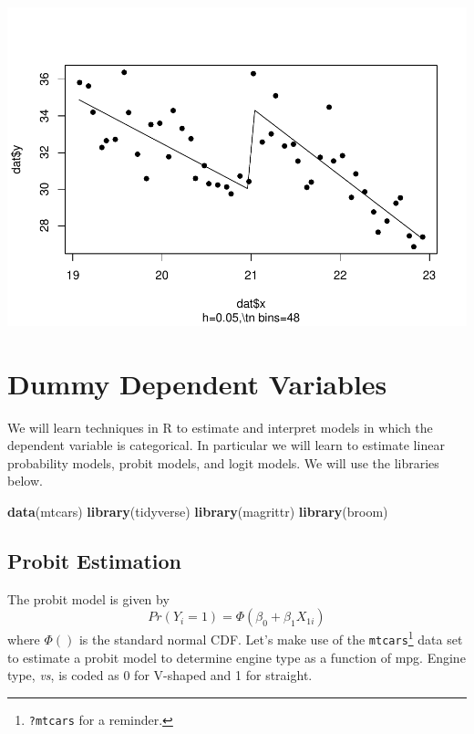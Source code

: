 \documentclass[]{book}
\newenvironment{Shaded}{\begin{snugshade}}{\end{snugshade}}
\newcommand{\KeywordTok}[1]{\textcolor[rgb]{0.13,0.29,0.53}{\textbf{#1}}}
\newcommand{\NormalTok}[1]{#1}
\let\rmarkdownfootnote\footnote%
\def\footnote{\protect\rmarkdownfootnote}
\begin{document}
\includegraphics{bailey_files/figure-latex/unnamed-chunk-122-2.pdf}

\hypertarget{chp12}{%
\chapter{Dummy Dependent Variables}\label{chp12}}

We will learn techniques in R to estimate and interpret models in which the dependent variable is categorical. In particular we will learn to estimate linear probability models, probit models, and logit models. We will use the libraries below.

\begin{Shaded}
\begin{Highlighting}[]
\KeywordTok{data}\NormalTok{(mtcars)}
\KeywordTok{library}\NormalTok{(tidyverse)}
\KeywordTok{library}\NormalTok{(magrittr)}
\KeywordTok{library}\NormalTok{(broom)}
\end{Highlighting}
\end{Shaded}

\hypertarget{probit-estimation}{%
\section{Probit Estimation}\label{probit-estimation}}

The probit model is given by \[Pr(Y_i=1)=\Phi(\beta_0+\beta_1X_{1i})\] where \(\Phi()\) is the standard normal CDF. Let's make use of the \texttt{mtcars}\footnote{\texttt{?mtcars} for a reminder.} data set to estimate a probit model to determine engine type as a function of mpg. Engine type, \emph{vs}, is coded as 0 for V-shaped and 1 for straight.
\end{document}
